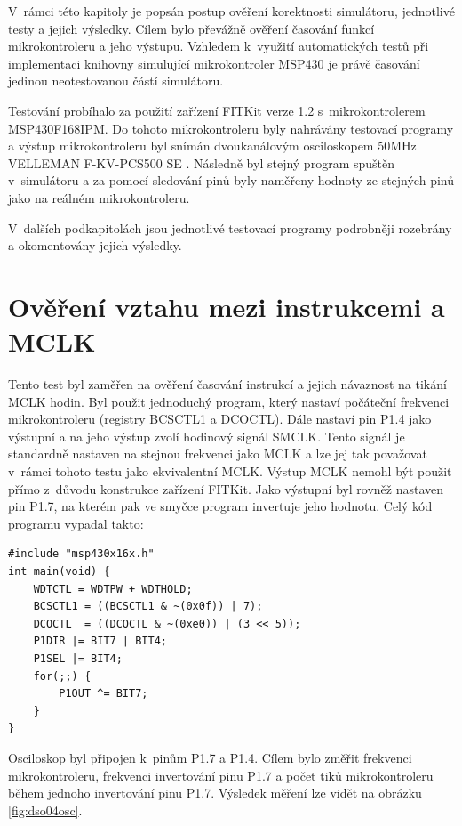 V~rámci této kapitoly je popsán postup ověření korektnosti simulátoru, jednotlivé testy a jejich výsledky. Cílem bylo převážně ověření časování funkcí mikrokontroleru a jeho výstupu. Vzhledem k~využití automatických testů při implementaci knihovny simulující mikrokontroler MSP430 je právě časování jedinou neotestovanou částí simulátoru.

Testování probíhalo za použití zařízení FITKit verze 1.2 s~mikrokontrolerem \newline MSP430F168IPM. Do tohoto mikrokontroleru byly nahrávány testovací programy a výstup mikrokontroleru byl snímán dvoukanálovým osciloskopem 50MHz VELLEMAN F-KV-PCS500 SE \cite{velleman}. Následně byl stejný program spuštěn v~simulátoru a za pomocí sledování pinů byly naměřeny hodnoty ze stejných pinů jako na reálném mikrokontroleru.

V~dalších podkapitolách jsou jednotlivé testovací programy podrobněji rozebrány a okomentovány jejich výsledky.

\section{Ověření vztahu mezi instrukcemi a MCLK}
\label{test1}

Tento test byl zaměřen na ověření časování instrukcí a jejich návaznost na tikání MCLK hodin. Byl použit jednoduchý program, který nastaví počáteční frekvenci mikrokontroleru (registry BCSCTL1 a DCOCTL). Dále nastaví pin P1.4 jako výstupní a na jeho výstup zvolí hodinový signál SMCLK. Tento signál je standardně nastaven na stejnou frekvenci jako MCLK a lze jej tak považovat v~rámci tohoto testu jako ekvivalentní MCLK. Výstup MCLK nemohl být použit přímo z~důvodu konstrukce zařízení FITKit. Jako výstupní byl rovněž nastaven pin P1.7, na kterém pak ve smyčce program invertuje jeho hodnotu. Celý kód programu vypadal takto:

\lstset{language=XML, numbers=left, frame=single, breaklines=true, tabsize=2, xleftmargin=20pt}
\begin{lstlisting}
#include "msp430x16x.h"
int main(void) {
	WDTCTL = WDTPW + WDTHOLD;
	BCSCTL1 = ((BCSCTL1 & ~(0x0f)) | 7);
	DCOCTL  = ((DCOCTL & ~(0xe0)) | (3 << 5));
	P1DIR |= BIT7 | BIT4;
	P1SEL |= BIT4;
	for(;;) {
		P1OUT ^= BIT7;
	}
}
\end{lstlisting}

Osciloskop byl připojen k~pinům P1.7 a P1.4. Cílem bylo změřit frekvenci mikrokontroleru, frekvenci invertování pinu P1.7 a počet tiků mikrokontroleru během jednoho invertování pinu P1.7. Výsledek měření lze vidět na obrázku \ref{fig:dso04osc}.

